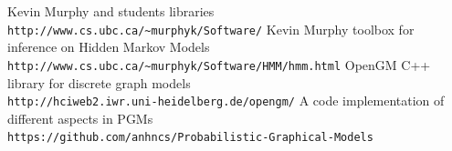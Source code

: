\documentclass{article}
\begin{document}
    \vspace{0.5cm}
    \begin{thebibliography}{9}
        Kevin Murphy and students libraries \\\texttt{http://www.cs.ubc.ca/\~{}murphyk/Software/}
        Kevin Murphy toolbox for inference on Hidden Markov Models \\\texttt{http://www.cs.ubc.ca/\~{}murphyk/Software/HMM/hmm.html}
        OpenGM C++ library for discrete graph models \\\texttt{http://hciweb2.iwr.uni-heidelberg.de/opengm/}
        A code implementation of different aspects in PGMs
        \\\texttt{https://github.com/anhncs/Probabilistic-Graphical-Models}
    \end{thebibliography}
\end{document}

